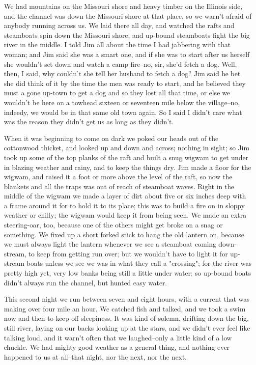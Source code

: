 We had mountains on the Missouri shore and heavy timber on the Illinois
side, and the channel was down the Missouri shore at that place, so we
warn't afraid of anybody running across us.  We laid there all day, and
watched the rafts and steamboats spin down the Missouri shore, and
up-bound steamboats fight the big river in the middle.  I told Jim all
about the time I had jabbering with that woman; and Jim said she was a
smart one, and if she was to start after us herself she wouldn't set down
and watch a camp fire--no, sir, she'd fetch a dog.  Well, then, I said,
why couldn't she tell her husband to fetch a dog?  Jim said he bet she
did think of it by the time the men was ready to start, and he believed
they must a gone up-town to get a dog and so they lost all that time, or
else we wouldn't be here on a towhead sixteen or seventeen mile below the
village--no, indeedy, we would be in that same old town again.  So I said
I didn't care what was the reason they didn't get us as long as they
didn't.

When it was beginning to come on dark we poked our heads out of the
cottonwood thicket, and looked up and down and across; nothing in sight;
so Jim took up some of the top planks of the raft and built a snug wigwam
to get under in blazing weather and rainy, and to keep the things dry.
Jim made a floor for the wigwam, and raised it a foot or more above the
level of the raft, so now the blankets and all the traps was out of reach
of steamboat waves.  Right in the middle of the wigwam we made a layer of
dirt about five or six inches deep with a frame around it for to hold it
to its place; this was to build a fire on in sloppy weather or chilly;
the wigwam would keep it from being seen.  We made an extra steering-oar,
too, because one of the others might get broke on a snag or something.
We fixed up a short forked stick to hang the old lantern on, because we
must always light the lantern whenever we see a steamboat coming
down-stream, to keep from getting run over; but we wouldn't have to light
it for up-stream boats unless we see we was in what they call a
"crossing"; for the river was pretty high yet, very low banks being still
a little under water; so up-bound boats didn't always run the channel,
but hunted easy water.

This second night we run between seven and eight hours, with a current
that was making over four mile an hour.  We catched fish and talked, and
we took a swim now and then to keep off sleepiness.  It was kind of
solemn, drifting down the big, still river, laying on our backs looking
up at the stars, and we didn't ever feel like talking loud, and it warn't
often that we laughed--only a little kind of a low chuckle.  We had
mighty good weather as a general thing, and nothing ever happened to us
at all--that night, nor the next, nor the next.

